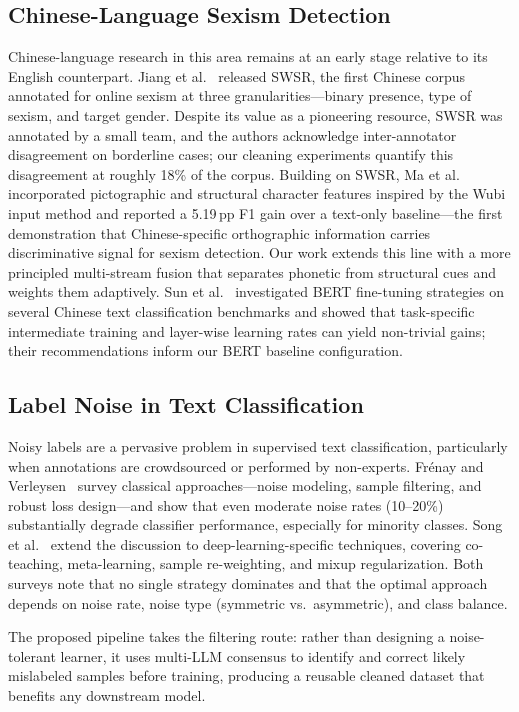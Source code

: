﻿\documentclass[12pt]{article}
\begin{document}
\subsection{Chinese-Language Sexism Detection}
Chinese-language research in this area remains at an early stage relative to its English counterpart. Jiang et al.~\cite{jiang2022swsr} released SWSR, the first Chinese corpus annotated for online sexism at three granularities---binary presence, type of sexism, and target gender. Despite its value as a pioneering resource, SWSR was annotated by a small team, and the authors acknowledge inter-annotator disagreement on borderline cases; our cleaning experiments quantify this disagreement at roughly 18\% of the corpus. Building on SWSR, Ma et al.~\cite{ma2024gender} incorporated pictographic and structural character features inspired by the Wubi input method and reported a 5.19\,pp F1 gain over a text-only baseline---the first demonstration that Chinese-specific orthographic information carries discriminative signal for sexism detection. Our work extends this line with a more principled multi-stream fusion that separates phonetic from structural cues and weights them adaptively. Sun et al.~\cite{sun2019finetune} investigated BERT fine-tuning strategies on several Chinese text classification benchmarks and showed that task-specific intermediate training and layer-wise learning rates can yield non-trivial gains; their recommendations inform our BERT baseline configuration.

\subsection{Label Noise in Text Classification}
Noisy labels are a pervasive problem in supervised text classification, particularly when annotations are crowdsourced or performed by non-experts. Fr\'{e}nay and Verleysen~\cite{frenay2014label} survey classical approaches---noise modeling, sample filtering, and robust loss design---and show that even moderate noise rates (10--20\%) substantially degrade classifier performance, especially for minority classes. Song et al.~\cite{song2023noisy} extend the discussion to deep-learning-specific techniques, covering co-teaching, meta-learning, sample re-weighting, and mixup regularization. Both surveys note that no single strategy dominates and that the optimal approach depends on noise rate, noise type (symmetric vs.\ asymmetric), and class balance.

The proposed pipeline takes the filtering route: rather than designing a noise-tolerant learner, it uses multi-LLM consensus to identify and correct likely mislabeled samples before training, producing a reusable cleaned dataset that benefits any downstream model.
\end{document}
